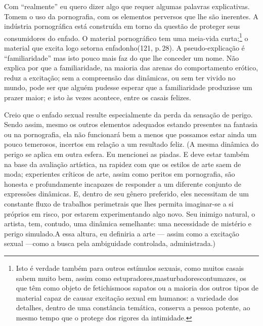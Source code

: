 Com ``realmente'' eu quero dizer algo que
requer algumas palavras explicativas. Tomem o uso da pornografia, com
os elementos perversos que lhe são inerentes. A indústria pornográfica
está construída em torno da questão de proteger seus consumidores do
enfado.\idxpornoenfa{} O material pornográfico tem uma meia-vida curta;\footnote{ Isto
é verdade também para outros estímulos sexuais, como muitos casais
sabem muito bem, assim como estupradores,\idxestup[|nn] masturbadores\idxmastur[|nn] contumazes, os
que têm como objeto de fetichismo\idxfetic[|nn] os sapatos ou a maioria dos outros
tipos de material capaz de causar excitação sexual em humanos: a
variedade dos detalhes, dentro de uma constância temática, conserva a
pessoa potente, ao mesmo tempo que o protege dos rigores da
intimidade.} o material que excita logo se\idxpornoenfa[|nn] torna enfadonho\idxenfafamil[|nn] (121, p.\,28).
A pseudo-explicação é ``familiaridade'' mas
isto pouco mais faz do que lhe conceder um nome. Não explica por que a
familiaridade, na maioria das arenas do comportamento erótico, reduz a
excitação; sem a compreensão das dinâmicas, ou sem ter vivido no mundo,
pode ser que alguém pudesse esperar que a familiaridade produzisse um
prazer maior; e isto às vezes acontece, entre os casais felizes.

Creio que o enfado sexual resulte especialmente da perda da sensação
de perigo. Sendo assim, mesmo os outros elementos adequados estando
presentes na fantasia ou na pornografia, ela não funcionará bem a
menos que possamos estar ainda um pouco temerosos, incertos em relação
a um resultado feliz. (A mesma dinâmica do perigo se aplica em outra
esfera. Eu mencionei as piadas. E deve estar também na base da
avaliação artística, na rapidez com que os estilos de arte saem de
moda; experientes críticos de arte, assim como peritos em pornografia,
são honesta e profundamente incapazes de responder a um diferente
conjunto de expressões dinâmicas. E, dentro de seu gênero preferido,
eles necessitam de um constante fluxo de trabalhos perimetrais que lhes
permita imaginar-se a si próprios em risco, por estarem experimentando
algo novo. Seu inimigo natural, o artista, tem, contudo, uma dinâmica
semelhante: uma necessidade de mistério e perigo simulado.\idxenfa[|)] A essa
altura, eu definiria a arte --- assim como a excitação sexual ---\idxpervenfad[|)]
como a busca pela ambiguidade\idxsexueamb{} controlada, administrada.)

